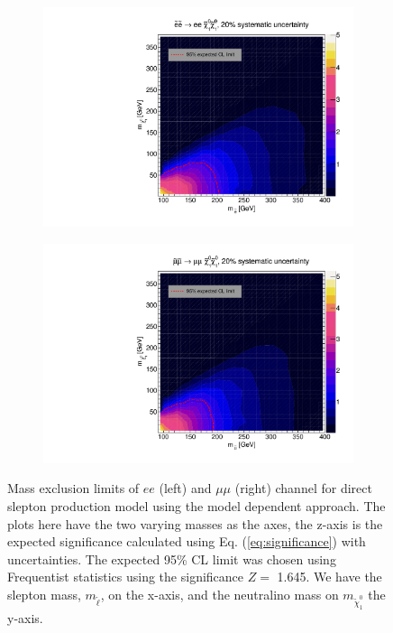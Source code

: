 \documentclass[12pt, a4paper]{book}
\begin{document}
\begin{figure}[!ht]
	\centering
   \begin{subfigure}[b]{0.49\textwidth}
      \centering
      \includegraphics[width=1\textwidth]{Limits/SlepSlep/SlepSlep_ee.pdf}
      \end{subfigure}
   \hfill
   \begin{subfigure}[b]{0.49\textwidth}
      \centering
      \includegraphics[width=1\textwidth]{Limits/SlepSlep/SlepSlep_uu.pdf}
      \end{subfigure}
   \caption[Expected mass exclusion limits of $ee$ and $\mu\mu$ channel for all direct slepton production model using the model dependent approach]{Mass exclusion limits of $ee$ (left) and $\mu\mu$ (right) channel for direct slepton production model using the model dependent approach. 
   The plots here have the two varying masses as the axes, the z-axis is the expected significance calculated using Eq. (\ref{eq:significance}) with uncertainties. The expected 95\% CL limit was chosen using Frequentist statistics using the significance $Z=$ 1.645.   
   We have the slepton mass, $m_{\tilde{\ell}}$, on the x-axis, and the neutralino mass on $m_{\tilde{\chi}_1^0}$ the y-axis.}
\end{figure}
\end{document}
